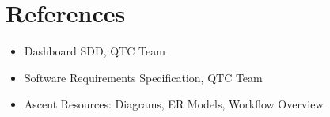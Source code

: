 \documentclass[12pt]{article}
\begin{document}
\section{References}
\begin{itemize}
    \item Dashboard SDD, QTC Team
    \item Software Requirements Specification, QTC Team
    \item Ascent Resources: Diagrams, ER Models, Workflow Overview
\end{itemize}
\end{document}
